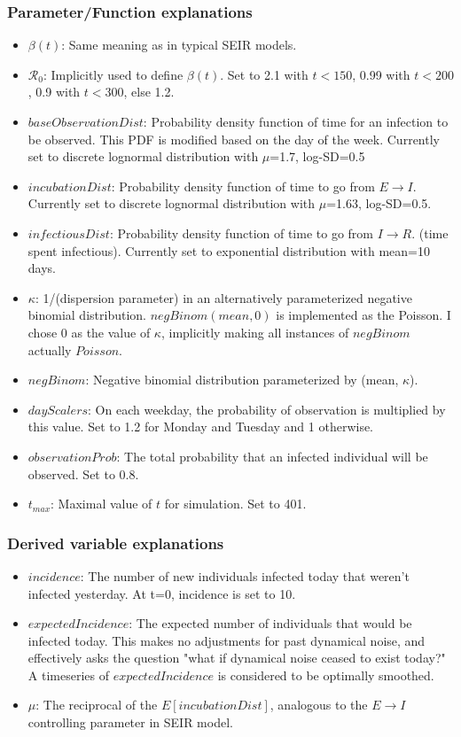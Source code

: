\documentclass{article}
\newcommand{\nR}{\mathscr{R}}
\begin{document}
\subsubsection{Parameter/Function explanations}
\begin{itemize}
    \item $\beta(t)$: Same meaning as in typical SEIR models.
    \item $\nR_0$: Implicitly used to define $\beta(t)$. Set to 2.1 with $t < 150$, 0.99 with $t<200$, 0.9 with $t<300$, else 1.2.
    \item $baseObservationDist$: Probability density function of time for an infection to be observed. This PDF is modified based on the day of the week. Currently set to discrete lognormal distribution with $\mu$=1.7, log-SD=0.5 
    \item $incubationDist$: Probability density function of time to go from $E \rightarrow I$. Currently set to discrete lognormal distribution with $\mu$=1.63, log-SD=0.5. \cite{McAloon}
    \item $infectiousDist$: Probability density function of time to go from $I \rightarrow R$. (time spent infectious). Currently set to exponential distribution with mean=10 days. 
    \item $\kappa$: 1/(dispersion parameter) in an alternatively parameterized negative binomial distribution. \cite{NegBinom} $negBinom(mean, 0)$ is implemented as the Poisson. I chose 0 as the value of $\kappa$, implicitly making all instances of $negBinom$ actually $Poisson$.
    \item $negBinom$: Negative binomial distribution parameterized by (mean, $\kappa$). 
    \item $dayScalers$: On each weekday, the probability of observation is multiplied by this value. Set to 1.2 for Monday and Tuesday and 1 otherwise. 
    \item $observationProb$: The total probability that an infected individual will be observed. Set to 0.8.
    \item $t_{max}$: Maximal value of $t$ for simulation. Set to 401.
\end{itemize}

\subsubsection{Derived variable explanations}
\begin{itemize}
    \item $incidence$: The number of new individuals infected today that weren't infected yesterday. At t=0, incidence is set to 10.
    \item $expectedIncidence$: The expected number of individuals that would be infected today. This makes no adjustments for past dynamical noise, and effectively asks the question "what if dynamical noise ceased to exist today?" A timeseries of $expectedIncidence$ is considered to be optimally smoothed.
    \item $\mu$: The reciprocal of the $E[incubationDist]$, analogous to the $E \rightarrow I$ controlling parameter in SEIR model.
\end{itemize}
\end{document}
